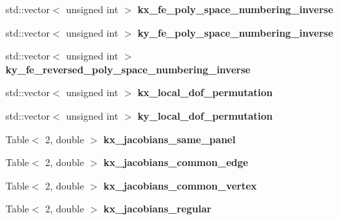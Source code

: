 \begin{DoxyCompactItemize}
std\+::vector$<$ unsigned int $>$ {\bfseries kx\+\_\+fe\+\_\+poly\+\_\+space\+\_\+numbering\+\_\+inverse}
\item 
\mbox{\label{structLaplaceBEM_1_1PairCellWiseScratchData_a4970716b43febb26cca3705cbcee97ce}} 
std\+::vector$<$ unsigned int $>$ {\bfseries ky\+\_\+fe\+\_\+poly\+\_\+space\+\_\+numbering\+\_\+inverse}
\item 
\mbox{\label{structLaplaceBEM_1_1PairCellWiseScratchData_a444fccb04e87630f9614792070e71238}} 
std\+::vector$<$ unsigned int $>$ {\bfseries ky\+\_\+fe\+\_\+reversed\+\_\+poly\+\_\+space\+\_\+numbering\+\_\+inverse}
\item 
\mbox{\label{structLaplaceBEM_1_1PairCellWiseScratchData_a32bf7e5a46d34fec6116bd2ec75f94c9}} 
std\+::vector$<$ unsigned int $>$ {\bfseries kx\+\_\+local\+\_\+dof\+\_\+permutation}
\item 
\mbox{\label{structLaplaceBEM_1_1PairCellWiseScratchData_a302d0112db325d77a42d1de4018550ec}} 
std\+::vector$<$ unsigned int $>$ {\bfseries ky\+\_\+local\+\_\+dof\+\_\+permutation}
\item 
\mbox{\label{structLaplaceBEM_1_1PairCellWiseScratchData_afee4ea6d2f9cfb16b2fac08b4453d474}} 
Table$<$ 2, double $>$ {\bfseries kx\+\_\+jacobians\+\_\+same\+\_\+panel}
\item 
\mbox{\label{structLaplaceBEM_1_1PairCellWiseScratchData_ac465e92705daa6b3811d06060aa44ebf}} 
Table$<$ 2, double $>$ {\bfseries kx\+\_\+jacobians\+\_\+common\+\_\+edge}
\item 
\mbox{\label{structLaplaceBEM_1_1PairCellWiseScratchData_a324b41050cc05a58d66142059c221389}} 
Table$<$ 2, double $>$ {\bfseries kx\+\_\+jacobians\+\_\+common\+\_\+vertex}
\item 
\mbox{\label{structLaplaceBEM_1_1PairCellWiseScratchData_a7a26f43e92b8fb0046b20bd6b554da9e}} 
Table$<$ 2, double $>$ {\bfseries kx\+\_\+jacobians\+\_\+regular}

\end{DoxyCompactItemize}
